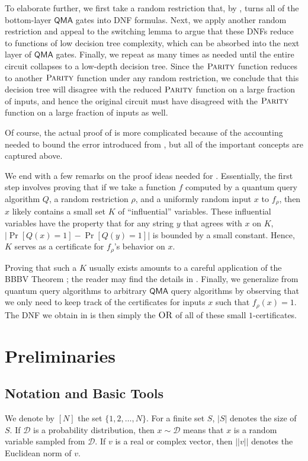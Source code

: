 \documentclass[10pt,a4paper]{article}
\newcommand{\OR}{\normalfont\textsc{OR}}
\newcommand{\PARITY}{\normalfont\textsc{Parity}}
\begin{document}
To elaborate further, we first take a random restriction that, by , turns all of the bottom-layer $\mathsf{QMA}$ gates into DNF formulas. Next, we apply another random restriction and appeal to the switching lemma to argue that these DNFs reduce to functions of low decision tree complexity, which can be absorbed into the next layer of $\mathsf{QMA}$ gates. Finally, we repeat as many times as needed until the entire circuit collapses to a low-depth decision tree. Since the $\PARITY$ function reduces to another $\PARITY$ function under any random restriction, we conclude that this decision tree will disagree with the reduced $\PARITY$ function on a large fraction of inputs, and hence the original circuit must have disagreed with the $\PARITY$ function on a large fraction of inputs as well.

Of course, the actual proof of  is more complicated because of the accounting needed to bound the error introduced from , but all of the important concepts are captured above.

We end with a few remarks on the proof ideas needed for . Essentially, the first step involves proving that if we take a function $f$ computed by a quantum query algorithm $Q$, a random restriction $\rho$, and a uniformly random input $x$ to $f_\rho$, then $x$ likely contains a small set $K$ of ``influential'' variables. These influential variables have the property that for any string $y$ that agrees with $x$ on $K$, $\left|\Pr[Q(x) = 1] - \Pr[Q(y) = 1]\right|$ is bounded by a small constant. Hence, $K$ serves as a certificate for $f_\rho$'s behavior on $x$.

Proving that such a $K$ usually exists amounts to a careful application of the BBBV Theorem \cite{BBBV97}; the reader may find the details in . Finally, we generalize from quantum query algorithms to arbitrary $\mathsf{QMA}$ query algorithms by observing that we only need to keep track of the certificates for inputs $x$ such that $f_\rho(x) = 1$. The DNF we obtain in  is then simply the $\OR$ of all of these small $1$-certificates.

\section{Preliminaries}
\subsection{Notation and Basic Tools}
We denote by $[N]$ the set $\{1,2,\ldots,N\}$. For a finite set $S$, $|S|$ denotes the size of $S$. If $\mathcal{D}$ is a probability distribution, then $x \sim \mathcal{D}$ means that $x$ is a random variable sampled from $\mathcal{D}$. If $v$ is a real or complex vector, then $||v||$ denotes the Euclidean norm of $v$.
\end{document}
